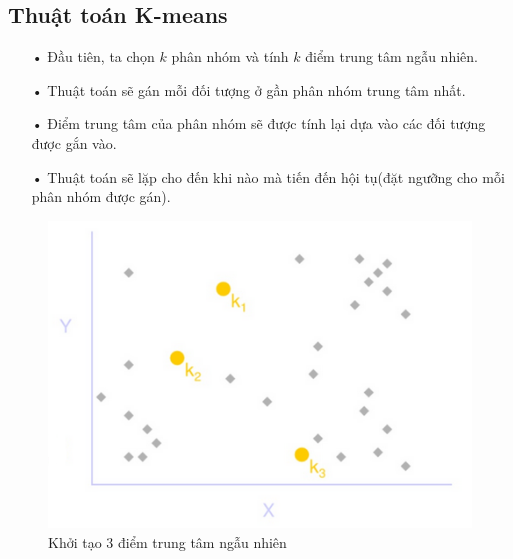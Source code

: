 \subsection{Thuật toán K-means}
\begin{enumerate}
\item[•]Đầu tiên, ta chọn $k$ phân nhóm và tính $k$ điểm trung tâm ngẫu nhiên.
\item[•]Thuật toán sẽ gán mỗi đối tượng ở gần phân nhóm trung tâm nhất.
\item[•]Điểm trung tâm của phân nhóm sẽ được tính lại dựa vào các đối tượng được gắn vào.
\item[•]Thuật toán sẽ lặp cho đến khi nào mà tiến đến hội tụ(đặt ngưỡng cho mỗi phân nhóm được gán).
\end{enumerate}

\begin{figure}[htp]
\centering
\includegraphics{Images/k_means_01}
\caption{Khởi tạo 3 điểm trung tâm ngẫu nhiên}
\label{fig:k_means_01}
\end{figure}

